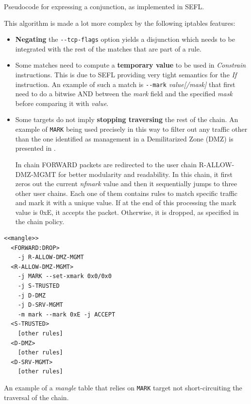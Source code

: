 {\begin{minipage}[t]{.45\textwidth}
\begin{listing}[H]
    \caption{Pseudocode for expressing a conjunction, as implemented in SEFL.}
    \label{algo:if-then-else2}
  \end{listing}
\end{minipage}

This algorithm is made a lot more complex by the following iptables features:
\begin{itemize}
  \item \textbf{Negating} the \lstinline{--tcp-flags} option yields a
    disjunction which needs to be integrated with the rest of the matches
    that are part of a rule.
  \item Some matches need to compute a \textbf{temporary value} to be used in
    \emph{Constrain} instructions. This is due to SEFL providing very tight
    semantics for the \emph{If} instruction.  An example of such a match is
    \lstinline{--mark} \emph{value[/mask]} that first need to do a bitwise AND
    between the \emph{mark} field and the specified \emph{mask}
    before comparing it with \emph{value}.
  \item Some targets do not imply \textbf{stopping traversing} the rest of the
    chain.  An example of \texttt{MARK} being used precisely in this way to
    filter out any traffic other than the one identified as management in a
    Demilitarized Zone (DMZ) is presented in
    .

    In chain FORWARD packets are redirected to the user chain R-ALLOW-DMZ-MGMT
    for better modularity and readability.  In this chain, it first zeros out
    the current \emph{nfmark} value and then it sequentially jumps to three
    other user chains.  Each one of them contains rules to match specific
    traffic and mark it with a unique value.  If at the end of this processing
    the mark value is 0xE, it accepts the packet.  Otherwise, it is dropped, as
    specified in the chain policy.
\end{itemize}

\begin{listing}
  \lstset{numbers=none, frame=single, basicstyle=\ttfamily,
    xleftmargin=0.25\textwidth, xrightmargin=0.25\textwidth
  }
  \small
  \begin{lstlisting}
<<mangle>>
  <FORWARD:DROP>
    -j R-ALLOW-DMZ-MGMT
  <R-ALLOW-DMZ-MGMT>
    -j MARK --set-xmark 0x0/0x0
    -j S-TRUSTED
    -j D-DMZ
    -j D-SRV-MGMT
    -m mark --mark 0xE -j ACCEPT
  <S-TRUSTED>
    [other rules]
  <D-DMZ>
    [other rules]
  <D-SRV-MGMT>
    [other rules]
  \end{lstlisting}
  \caption{An example of a \emph{mangle} table that relies on \texttt{MARK}
  target not short-circuiting the traversal of the chain.}
  \label{lst:using-mark}
\end{listing}

}
